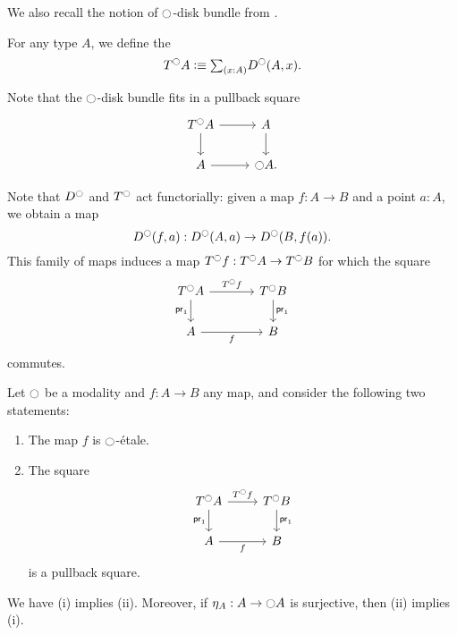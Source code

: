 \documentclass[9pt,twosided]{amsart}
\begin{document}
We also recall the notion of ${\ocircle}$-disk bundle from \cite{wellen-thesis}.

\begin{defn}
  For any type $A$, we define the 
  \begin{equation*}
    T^\modal A \defeq \sm{x:A}D^\modal(A,x).
  \end{equation*}
\end{defn}

Note that the ${\ocircle}$-disk bundle fits in a pullback square
\begin{equation*}
  \begin{tikzcd}
    T^\modal A \arrow[r] \arrow[d] & A \arrow[d] \\
    A \arrow[r] & \modal A.
  \end{tikzcd}
\end{equation*}

Note that $D^{\ocircle}$ and $T^{\ocircle}$ act functorially: given a map $f:A\to B$ and a point $a:A$, we obtain a map
\begin{equation*}
  D^{\ocircle}(f,a) : D^{\ocircle}(A,a)\to D^{\ocircle}(B,f(a)).
\end{equation*}
This family of maps induces a map $T^{\ocircle} f:T^{\ocircle} A \to T^{\ocircle} B$ for which the square
\begin{equation*}
  \begin{tikzcd}[column sep=large]
    T^\modal A \arrow[r,"T^\modal f"] \arrow[d,swap,"\proj 1"] & T^\modal B \arrow[d,"\proj 1"] \\
    A \arrow[r,swap,"f"] & B
  \end{tikzcd}
\end{equation*}
commutes.

\begin{prp}\label{lem:etale_char}
  Let ${\ocircle}$ be a modality and $f:A\to B$ any map, and consider the following two statements:
  \begin{enumerate}
  \item The map $f$ is ${\ocircle}$-\'etale.
  \item The square
    \begin{equation*}
      \begin{tikzcd}
        T^\modal A \arrow[r,"T^\modal f"] \arrow[d,swap,"\proj 1"] & T^\modal B \arrow[d,"\proj 1"] \\
        A \arrow[r,swap,"f"] & B
      \end{tikzcd}
    \end{equation*}
    is a pullback square.
  \end{enumerate}
  We have (i) implies (ii). Moreover, if $\eta_A:A\to{\ensuremath{\ocircle}} A$ is surjective, then (ii) implies (i).
\end{prp}
\end{document}
